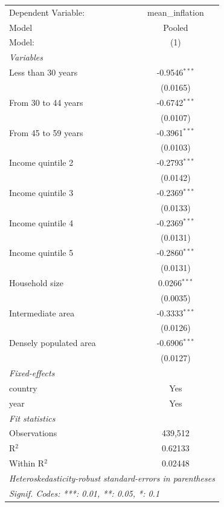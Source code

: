 
\begingroup
\centering
\begin{tabular}{lc}
   \tabularnewline \midrule \midrule
   Dependent Variable:    & mean\_inflation\\   
   Model                  & Pooled \\   
   Model:                 & (1)\\  
   \midrule
   \emph{Variables}\\
   Less than 30 years     & -0.9546$^{***}$\\   
                          & (0.0165)\\   
   From 30 to 44 years    & -0.6742$^{***}$\\   
                          & (0.0107)\\   
   From 45 to 59 years    & -0.3961$^{***}$\\   
                          & (0.0103)\\   
   Income quintile 2      & -0.2793$^{***}$\\   
                          & (0.0142)\\   
   Income quintile 3      & -0.2369$^{***}$\\   
                          & (0.0133)\\   
   Income quintile 4      & -0.2369$^{***}$\\   
                          & (0.0131)\\   
   Income quintile 5      & -0.2860$^{***}$\\   
                          & (0.0131)\\   
   Household size         & 0.0266$^{***}$\\   
                          & (0.0035)\\   
   Intermediate area      & -0.3333$^{***}$\\   
                          & (0.0126)\\   
   Densely populated area & -0.6906$^{***}$\\   
                          & (0.0127)\\   
   \midrule
   \emph{Fixed-effects}\\
   country                & Yes\\  
   year                   & Yes\\  
   \midrule
   \emph{Fit statistics}\\
   Observations           & 439,512\\  
   R$^2$                  & 0.62133\\  
   Within R$^2$           & 0.02448\\  
   \midrule \midrule
   \multicolumn{2}{l}{\emph{Heteroskedasticity-robust standard-errors in parentheses}}\\
   \multicolumn{2}{l}{\emph{Signif. Codes: ***: 0.01, **: 0.05, *: 0.1}}\\
\end{tabular}
\par\endgroup


